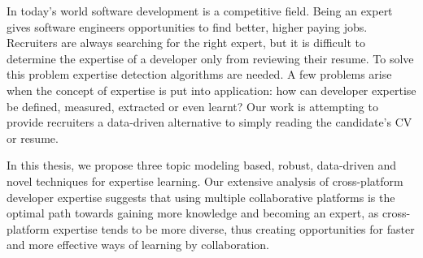 In today's world software development is a competitive field. Being an expert gives software engineers opportunities to find better, higher paying jobs. Recruiters are always searching for the right expert, but it is difficult to determine the expertise of a developer only from reviewing their resume. To solve this problem expertise detection algorithms are needed. A few problems arise when the concept of expertise is put into application: how can developer expertise be defined, measured, extracted or even learnt? Our work is attempting to provide recruiters a data-driven alternative to simply reading the candidate's CV or resume. 

In this thesis, we propose three topic modeling based, robust, data-driven and novel techniques for expertise learning. Our extensive analysis of cross-platform developer expertise suggests that using multiple collaborative platforms is the optimal path towards gaining more knowledge and becoming an expert, as cross-platform expertise tends to be more diverse, thus creating opportunities for faster and more effective ways of learning by collaboration.
